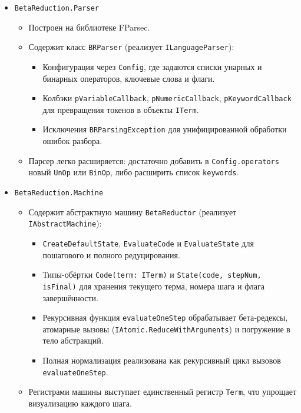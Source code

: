 \begin{itemize}
  \item \texttt{BetaReduction.Parser}  
    \begin{itemize}
      \item Построен на библиотеке FParsec.  
      \item Содержит класс \texttt{BRParser} (реализует \texttt{ILanguageParser}):  
        \begin{itemize}
          \item Конфигурация через \texttt{Config}, где задаются списки унарных и бинарных операторов, ключевые слова и флаги.
          \item Колбэки \texttt{pVariableCallback}, \texttt{pNumericCallback}, \texttt{pKeywordCallback} для превращения токенов в объекты \texttt{ITerm}.
          \item Исключения \texttt{BRParsingException} для унифицированной обработки ошибок разбора.
        \end{itemize}
      \item Парсер легко расширяется: достаточно добавить в \texttt{Config.operators} новый \texttt{UnOp} или \texttt{BinOp}, либо расширить список \texttt{keywords}.
    \end{itemize}

  \item \texttt{BetaReduction.Machine}  
    \begin{itemize}
      \item Содержит абстрактную машину \texttt{BetaReductor} (реализует \texttt{IAbstractMachine}):  
        \begin{itemize}
          \item \texttt{CreateDefaultState}, \texttt{EvaluateCode} и \texttt{EvaluateState} для пошагового и полного редуцирования.
          \item Типы-обёртки \texttt{Code(term: ITerm)} и \texttt{State(code, stepNum, isFinal)} для хранения текущего терма, номера шага и флага завершённости.
          \item Рекурсивная функция \texttt{evaluateOneStep} обрабатывает бета‑редексы, атомарные вызовы (\texttt{IAtomic.ReduceWithArguments}) и погружение в тело абстракций.
          \item Полная нормализация реализована как рекурсивный цикл вызовов \\\texttt{evaluateOneStep}.
        \end{itemize}
      \item Регистрами машины выступает единственный регистр \texttt{Term}, что упрощает визуализацию каждого шага.
    \end{itemize}


\end{itemize}
